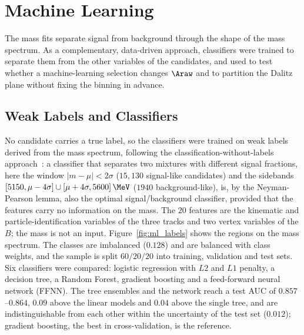 \section{Machine Learning}
\label{sec:ml}
The mass fits separate signal from background through the shape of the mass spectrum. As a complementary, data-driven approach, classifiers were trained to separate them from the other variables of the candidates, and used to test whether a machine-learning selection changes $\Araw$ and to partition the Dalitz plane without fixing the binning in advance.

\subsection{Weak Labels and Classifiers}
\label{sec:ml_labels}
\label{sec:ml_models}
No candidate carries a true label, so the classifiers were trained on weak labels derived from the mass spectrum, following the classification-without-labels approach~\cite{cwola}: a classifier that separates two mixtures with different signal fractions, here the window $|m-\mu|<2\sigma$ ($15{,}130$ signal-like candidates) and the sidebands $[5150,\mu-4\sigma]\cup[\mu+4\sigma,5600]\,\MeV$ ($1940$ background-like), is, by the Neyman-Pearson lemma, also the optimal signal/background classifier, provided that the features carry no information on the mass. The $20$ features are the kinematic and particle-identification variables of the three tracks and two vertex variables of the $B$; the mass is not an input. Figure~\ref{fig:ml_labels} shows the regions on the mass spectrum. The classes are imbalanced ($0.128$) and are balanced with class weights, and the sample is split $60/20/20$ into training, validation and test sets. Six classifiers were compared: logistic regression with $L2$ and $L1$ penalty, a decision tree, a Random Forest, gradient boosting and a feed-forward neural network (FFNN). The tree ensembles and the network reach a test AUC of $0.857$--$0.864$, $0.09$ above the linear models and $0.04$ above the single tree, and are indistinguishable from each other within the uncertainty of the test set ($0.012$); gradient boosting, the best in cross-validation, is the reference.


